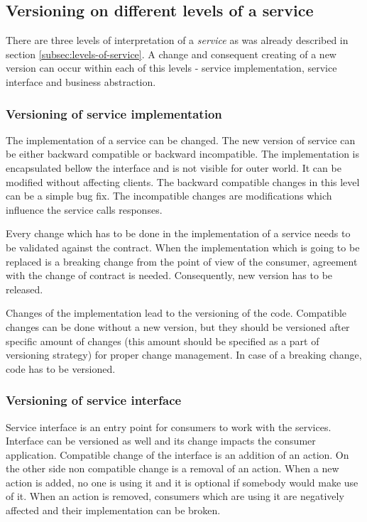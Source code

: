 \subsection{Versioning on different levels of a service}
There are three levels of interpretation of a \emph{service} as was already described in section \ref{subsec:levels-of-service}. A change and consequent creating of a new version can occur within each of this levels - service implementation, service interface and business abstraction.

\subsubsection{Versioning of service implementation}
The implementation of a service can be changed. The new version of service can be either backward compatible or backward incompatible. The implementation is encapsulated bellow the interface and is not visible for outer world. It can be modified without affecting clients. The backward compatible changes in this level can be a simple bug fix. The incompatible changes are modifications which influence the service calls responses.

Every change which has to be done in the implementation of a service needs to be validated against the contract. When the implementation which is going to be replaced is a breaking change from the point of view of the consumer, agreement with the change of contract is needed. Consequently, new version has to be released.

Changes of the implementation lead to the versioning of the code. Compatible changes can be done without a new version, but they should be versioned after specific amount of changes (this amount should be specified as a part of versioning strategy) for proper change management. In case of a breaking change, code has to be versioned.

\subsubsection{Versioning of service interface}
Service interface is an entry point for consumers to work with the services. Interface can be versioned as well and its change impacts the consumer application. Compatible change of the interface is an addition of an action. On the other side non compatible change is a removal of an action. When a new action is added, no one is using it and it is optional if somebody would make use of it. When an action is removed, consumers which are using it are negatively affected and their implementation can be broken.

